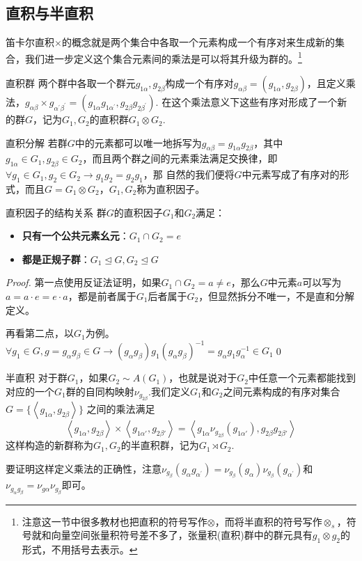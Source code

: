\subsection{直积与半直积}
笛卡尔直积$\times$的概念就是两个集合中各取一个元素构成一个有序对来生成新的集合，我们进一步定义这个集合元素间的乘法是可以将其升级为群的。\footnote{注意这一节中很多教材也把直积的符号写作$\otimes$，而将半直积的符号写作$\otimes_s$，符号就和向量空间张量积符号差不多了，张量积(直积)群中的群元具有$g_1\otimes g_2$的形式，不用括号去表示。}
\begin{define}{直积群}
    两个群中各取一个群元$g_{1\alpha},g_{2\beta}$构成一个有序对$g_{\alpha\beta}=(g_{1\alpha},g_{2\beta})$，且定义乘法，$g_{\alpha\beta}\times g_{\alpha^\prime\beta^\prime}
    =(g_{1\alpha}g_{1\alpha^\prime},g_{2\beta}g_{2\beta^\prime})$. 在这个乘法意义下这些有序对形成了一个新的群$G$，记为$G_1,G_2$的直积群$G_1\otimes G_2$.
\end{define}
\begin{define}{直积分解}
    若群$G$中的元素都可以唯一地拆写为$g_{\alpha\beta}=g_{1\alpha}g_{2\beta}$，其中$g_{1\alpha}\in G_1,g_{2\beta}\in G_2$，而且两个群之间的元素乘法满足交换律，即$\forall g_1\in G_1,g_2\in G_2\rightarrow g_1g_2=g_2g_1$，那
    自然的我们便将$G$中元素写成了有序对的形式，而且$G=G_1\otimes G_2$，$G_1,G_2$称为直积因子。
\end{define}
\begin{theorem}{直积因子的结构关系}
    群$G$的直积因子$G_1$和$G_2$满足：
    \begin{itemize}
        \item \textbf{只有一个公共元素幺元}：$G_1\cap G_2={e}$
        \item \textbf{都是正规子群}：$G_1\unlhd G, G_2\unlhd G$
    \end{itemize}
\end{theorem}
\begin{proof}
    第一点使用反证法证明，如果$G_1\cap G_2=a\neq e$，那么$G$中元素$a$可以写为$a=a\cdot e=e\cdot a$，都是前者属于$G_1$后者属于$G_2$，但显然拆分不唯一，不是直和分解定义。

    再看第二点，以$G_1$为例。$\forall g_1\in G,g=g_\alpha g_\beta\in G\rightarrow (g_\alpha g_\beta)g_1(g_\alpha g_\beta)^{-1}=g_{\alpha} g_1 g_{\alpha}^{-1}\in G_1$\qed
\end{proof}

\begin{define}{半直积}
    对于群$G_1$，如果$G_2\sim A(G_1)$，也就是说对于$G_2$中任意一个元素都能找到对应的一个$G_1$群的自同构映射$\nu_{g_{2\beta}}$.我们定义$G_1$和$G_2$之间元素构成的有序对集合$G=\{\left \langle g_{1\alpha},g_{2\beta}\right\rangle\}$
    之间的乘法满足
    \[\left\langle {{g_{1\alpha }},{g_{2\beta }}} \right\rangle  \times \left\langle {{g_{1\alpha '}},{g_{2\beta '}}} \right\rangle  = \left\langle {{g_{1\alpha }}{\nu _{{g_{2\beta }}}}({g_{1\alpha '}}),{g_{2\beta }}{g_{2\beta '}}} \right\rangle \]
    这样构造的新群称为$G_1,G_2$的半直积群，记为$G_1 \rtimes G_2$.
\end{define}
要证明这样定义乘法的正确性，注意$\nu_{g_{\beta}}(g_{\alpha}g_{\alpha^\prime})=\nu_{g_{\beta}}(g_{\alpha})\nu_{g_{\beta}}(g_{\alpha^\prime})$和$\nu_{g_\alpha g_\beta}=\nu_{g\alpha}\nu_{g_\beta}$即可。

